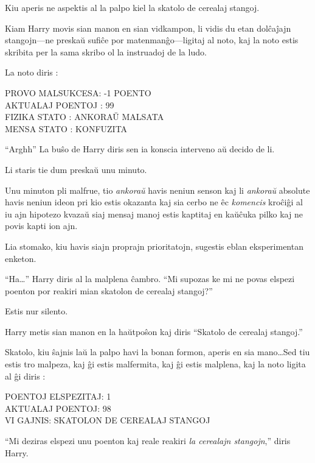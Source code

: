 Kiu aperis ne aspektis al la palpo kiel la skatolo de cerealaj stangoj.

Kiam Harry movis sian manon en sian vidkampon, li vidis du etan
dolĉaĵajn stangojn—ne preskaŭ sufiĉe por matenmanĝo—ligitaj al noto, kaj
la noto estis skribita per la sama skribo ol la instruadoj de la ludo.

La noto diris :
\medskip

\begin{center}
  PROVO MALSUKCESA: -1 POENTO\\
  AKTUALAJ POENTOJ : 99\\
  FIZIKA STATO : ANKORAŬ MALSATA\\
  MENSA STATO : KONFUZITA\\
\end{center}

\medskip

``Arghh'' La buŝo de Harry diris sen ia konscia interveno aŭ decido de
li.

Li staris tie dum preskaŭ unu minuto.

Unu minuton pli malfrue, tio \emph{ankoraŭ} havis neniun senson kaj li
\emph{ankoraŭ} absolute havis neniun ideon pri kio estis okazanta kaj
sia cerbo ne êc \emph{komencis} kroĉiĝi al iu ajn hipotezo kvazaŭ
siaj mensaj manoj estis kaptitaj en kaŭĉuka pilko kaj ne povis
kapti ion ajn.  

Lia stomako, kiu havis siajn proprajn prioritatojn, sugestis eblan
eksperimentan enketon.

``Ha\ldots'' Harry diris al la malplena ĉambro. ``Mi supozas ke mi ne povas
elspezi poenton por reakiri mian skatolon de cerealaj stangoj?''

Estis nur silento.

Harry metis sian manon en la haŭtpoŝon kaj diris ``Skatolo de cerealaj stangoj.''

Skatolo, kiu ŝajnis laŭ la palpo havi la bonan formon, aperis en sia
mano\ldots Sed tiu estis tro malpeza, kaj ĝi estis malfermita, kaj ĝi
estis malplena, kaj la noto ligita al ĝi diris :

\medskip
\begin{center}
  POENTOJ ELSPEZITAJ: 1\\
  AKTUALAJ POENTOJ: 98\\
  VI GAJNIS: SKATOLON DE CEREALAJ STANGOJ\\
\end{center}

``Mi deziras elspezi unu poenton kaj reale reakiri \emph{la cerealajn
stangojn},'' diris Harry.

